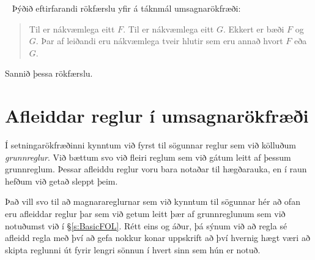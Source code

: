 \
\problempart
Þýðið eftirfarandi rökfærslu yfir á táknmál umsagnarökfræði:
	\begin{quote}
		Til er nákvæmlega eitt $F$. Til er nákvæmlega eitt $G$. Ekkert er bæði $F$ og $G$. Þar af leiðandi eru nákvæmlega tveir hlutir sem eru annað hvort $F$ eða $G$.
	\end{quote}
Sannið þessa rökfærslu.


\chapter{Afleiddar reglur í umsagnarökfræði}\label{s:DerivedFOL}

Í setningarökfræðinni kynntum við fyrst til sögunnar reglur sem við kölluðum \emph{grunnreglur}. Við bættum svo við fleiri reglum sem við gátum leitt af þessum grunnreglum. Þessar afleiddu reglur voru bara notaðar til hægðarauka, en í raun hefðum við getað sleppt þeim. 

Það vill svo til að magnarareglurnar sem við kynntum til sögunnar hér að ofan eru afleiddar reglur þar sem við getum leitt þær af grunnreglunum sem við notuðumst við í \S\ref{s:BasicFOL}. Rétt eins og áður, þá sýnum við að regla sé afleidd regla með því að gefa nokkur konar uppskrift að því hvernig hægt væri að skipta reglunni út fyrir lengri sönnun í hvert sinn sem hún er notuð.

